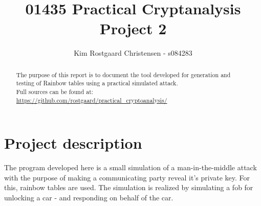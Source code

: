 \documentclass[10pt,a4paper]{article}
\title{01435 Practical Cryptanalysis\\Project 2}
\author{Kim Rostgaard Christensen - s084283}
\begin{document}
\maketitle
\begin{abstract}
The purpose of this report is to document the tool developed for generation and testing of Rainbow tables using a practical simulated attack.\\
Full sources can be found at:\\
 \url{https://github.com/rostgaard/practical_cryptoanalysis/}
\end{abstract}

\section*{Project description}
The program developed here is a small simulation of a man-in-the-middle attack with the purpose of making a communicating party reveal it's private key. For this, rainbow tables are used. The simulation is realized by simulating a fob for unlocking a car - and responding on behalf of the car.
\end{document}
